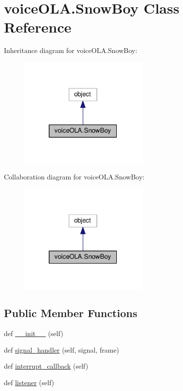 \hypertarget{classvoiceOLA_1_1SnowBoy}{}\section{voice\+O\+L\+A.\+Snow\+Boy Class Reference}
\label{classvoiceOLA_1_1SnowBoy}


Inheritance diagram for voice\+O\+L\+A.\+Snow\+Boy\+:\nopagebreak
\begin{figure}[H]
\begin{center}
\leavevmode
\includegraphics[width=184pt]{classvoiceOLA_1_1SnowBoy__inherit__graph}
\end{center}
\end{figure}


Collaboration diagram for voice\+O\+L\+A.\+Snow\+Boy\+:\nopagebreak
\begin{figure}[H]
\begin{center}
\leavevmode
\includegraphics[width=184pt]{classvoiceOLA_1_1SnowBoy__coll__graph}
\end{center}
\end{figure}
\subsection*{Public Member Functions}
\begin{DoxyCompactItemize}
\item 
def \hyperlink{classvoiceOLA_1_1SnowBoy_a8e78736d7f6c4bf9bc79aa857c9e1f36}{\+\_\+\+\_\+init\+\_\+\+\_\+} (self)
\item 
def \hyperlink{classvoiceOLA_1_1SnowBoy_a2770703754e331b443acbcc3fe97a5ca}{signal\+\_\+handler} (self, signal, frame)
\item 
def \hyperlink{classvoiceOLA_1_1SnowBoy_a14734dcdb17fbfd5709d3abf47c77e0e}{interrupt\+\_\+callback} (self)
\item 
def \hyperlink{classvoiceOLA_1_1SnowBoy_a0b7f93d9599b0862b67f1ecb3dc56b6e}{listener} (self)
\end{DoxyCompactItemize}
